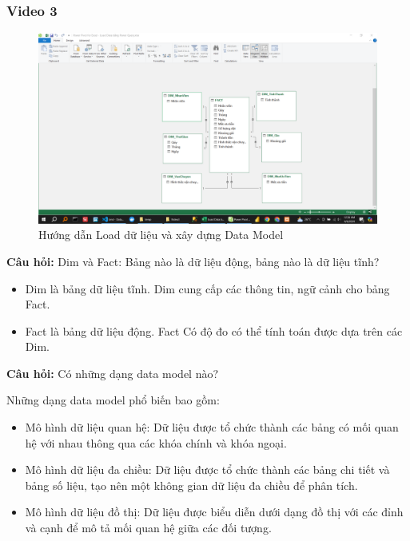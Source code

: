 \documentclass{article}
\begin{document}
\subsubsection{Video 3}




\begin{figure}[H]
    \centering
    \includegraphics[scale = 0.15]{Bai1/Video3/HuongDan/0.png}
    \caption{Hướng dẫn Load dữ liệu và xây dựng Data Model}
\end{figure}



\textbf{Câu hỏi:} Dim và Fact: Bảng nào là dữ liệu động, bảng nào là dữ liệu tĩnh?

\begin{itemize}
    \item  Dim là bảng dữ liệu tĩnh. Dim cung cấp các thông tin, ngữ cảnh cho bảng Fact.
    \item   Fact là bảng dữ liệu động. Fact Có độ đo có thể tính toán được dựa trên các Dim.
\end{itemize}

\textbf{Câu hỏi:}   Có những dạng data model nào?

Những dạng data model phổ biến bao gồm:

\begin{itemize}
    \item  Mô hình dữ liệu quan hệ: Dữ liệu được tổ chức thành các bảng có mối quan hệ với nhau thông qua các khóa chính và khóa ngoại.
    \item   Mô hình dữ liệu đa chiều: Dữ liệu được tổ chức thành các bảng chi tiết và bảng số liệu, tạo nên một không gian dữ liệu đa chiều để phân tích.
    \item    Mô hình dữ liệu đồ thị: Dữ liệu được biểu diễn dưới dạng đồ thị với các đỉnh và cạnh để mô tả mối quan hệ giữa các đối tượng.
\end{itemize}
\end{document}
